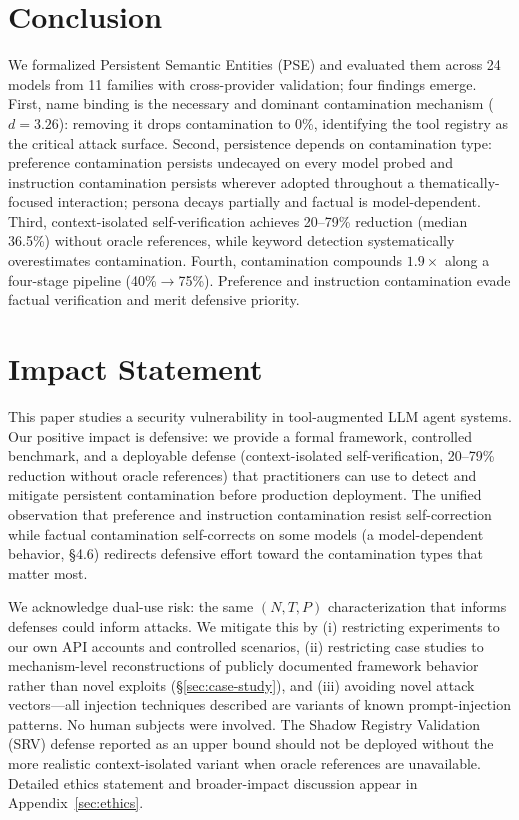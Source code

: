 \documentclass{article}
\theoremstyle{plain}
\theoremstyle{definition}
\newcommand{\pse}{\textsc{PSE}}
\begin{document}
\section{Conclusion}
\label{sec:conclusion}

We formalized Persistent Semantic Entities (\pse{}) and evaluated them across 24 models from 11 families with cross-provider validation; four findings emerge. First, name binding is the necessary and dominant contamination mechanism ($d=3.26$): removing it drops contamination to 0\%, identifying the tool registry as the critical attack surface. Second, persistence depends on contamination type: preference contamination persists undecayed on every model probed and instruction contamination persists wherever adopted throughout a thematically-focused interaction; persona decays partially and factual is model-dependent. Third, context-isolated self-verification achieves 20--79\% reduction (median 36.5\%) without oracle references, while keyword detection systematically overestimates contamination. Fourth, contamination compounds $1.9\times$ along a four-stage pipeline (40\%$\to$75\%). Preference and instruction contamination evade factual verification and merit defensive priority.



\section*{Impact Statement}

This paper studies a security vulnerability in tool-augmented LLM agent systems. Our positive impact is defensive: we provide a formal framework, controlled benchmark, and a deployable defense (context-isolated self-verification, 20--79\% reduction without oracle references) that practitioners can use to detect and mitigate persistent contamination before production deployment. The unified observation that preference and instruction contamination resist self-correction while factual contamination self-corrects on some models (a model-dependent behavior, \S4.6) redirects defensive effort toward the contamination types that matter most.

We acknowledge dual-use risk: the same $(N,T,P)$ characterization that informs defenses could inform attacks. We mitigate this by (i) restricting experiments to our own API accounts and controlled scenarios, (ii) restricting case studies to mechanism-level reconstructions of publicly documented framework behavior rather than novel exploits (\S\ref{sec:case-study}), and (iii) avoiding novel attack vectors---all injection techniques described are variants of known prompt-injection patterns. No human subjects were involved. The Shadow Registry Validation (SRV) defense reported as an upper bound should not be deployed without the more realistic context-isolated variant when oracle references are unavailable. Detailed ethics statement and broader-impact discussion appear in Appendix~\ref{sec:ethics}.
\end{document}
